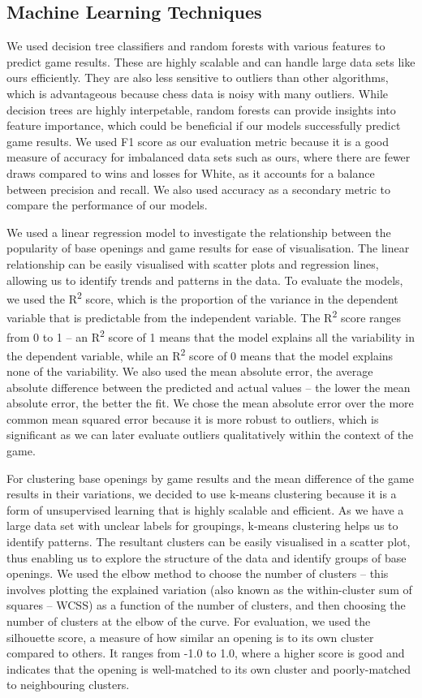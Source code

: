 \documentclass[a4paper, 11pt]{article}
\begin{document}
\subsection{Machine Learning Techniques}
We used decision tree classifiers and random forests with various features to predict game results. These are highly scalable and can handle large data sets like ours efficiently. They are also less sensitive to outliers than other algorithms, which is advantageous because chess data is noisy with many outliers. While decision trees are highly interpetable, random forests can provide insights into feature importance, which could be beneficial if our models successfully predict game results. We used F1 score as our evaluation metric because it is a good measure of accuracy for imbalanced data sets such as ours, where there are fewer draws compared to wins and losses for White, as it accounts for a balance between precision and recall. We also used accuracy as a secondary metric to compare the performance of our models.

We used a linear regression model to investigate the relationship between the popularity of base openings and game results for ease of visualisation. The linear relationship can be easily visualised with scatter plots and regression lines, allowing us to identify trends and patterns in the data. To evaluate the models, we used the R\textsuperscript{2} score, which is the proportion of the variance in the dependent variable that is predictable from the independent variable. The R\textsuperscript{2} score ranges from 0 to 1 -- an R\textsuperscript{2} score of 1 means that the model explains all the variability in the dependent variable, while an R\textsuperscript{2} score of 0 means that the model explains none of the variability. We also used the mean absolute error, the average absolute difference between the predicted and actual values -- the lower the mean absolute error, the better the fit. We chose the mean absolute error over the more common mean squared error because it is more robust to outliers, which is significant as we can later evaluate outliers qualitatively within the context of the game.

For clustering base openings by game results and the mean difference of the game results in their variations, we decided to use k-means clustering because it is a form of unsupervised learning that is highly scalable and efficient. As we have a large data set with unclear labels for groupings, k-means clustering helps us to identify patterns. The resultant clusters can be easily visualised in a scatter plot, thus enabling us to explore the structure of the data and identify groups of base openings. We used the elbow method to choose the number of clusters -- this involves plotting the explained variation (also known as the within-cluster sum of squares -- WCSS) as a function of the number of clusters, and then choosing the number of clusters at the elbow of the curve. For evaluation, we used the silhouette score, a measure of how similar an opening is to its own cluster compared to others. It ranges from -1.0 to 1.0, where a higher score is good and indicates that the opening is well-matched to its own cluster and poorly-matched to neighbouring clusters.
\end{document}
